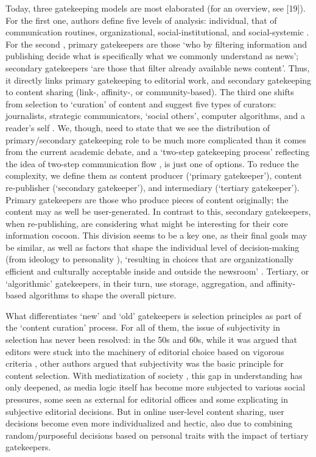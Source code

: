 Today, three gatekeeping models are most elaborated (for an overview, see [19]). For the first one, authors define five levels of analysis: individual, that of communication routines, organizational, social-institutional, and social-systemic \cite{ShoemakerVos}. For the second \cite{Nielsen}, primary gatekeepers are those ‘who by filtering information and publishing decide what is specifically what we commonly understand as news’; secondary gatekeepers ‘are those that filter already available news content’. Thus, it directly links primary gatekeeping to editorial work, and secondary gatekeeping to content sharing (link-, affinity-, or community-based). The third one \cite{ThorsonWells,WellsThroson} shifts from selection to ‘curation’ of content and suggest five types of curators: journalists, strategic communicators, ‘social others’, computer algorithms, and a reader’s self \cite[p.~35]{WellsThroson}
.
We, though, need to state that we see the distribution of primary/secondary gatekeeping role to be much more complicated than it comes from the current academic debate, and a ‘two-step gatekeeping process’ \cite{Singer} reflecting the idea of two-step communication flow \cite{Katz}, is just one of options. To reduce the complexity, we define them as content producer (‘primary gatekeeper’), content re-publisher (‘secondary gatekeeper’), and intermediary (‘tertiary gatekeeper’). Primary gatekeepers are those who produce pieces of content originally; the content may as well be user-generated. In contrast to this, secondary gatekeepers, when re-publishing, are considering what might be interesting for their core information cocoon. This division seems to be a key one, as their final goals may be similar, as well as factors that shape the individual level of decision-making (from ideology to personality \cite{ShoemakerReese}), ‘resulting in choices that are organizationally efficient and culturally acceptable inside and outside the newsroom’ \cite[p.~56]{Singer}. Tertiary, or ‘algorithmic’ \cite{Napoli} gatekeepers, in their turn, use storage, aggregation, and affinity-based algorithms to shape the overall picture.

What differentiates ‘new’ and ‘old’ gatekeepers is selection principles as part of the ‘content curation’ process. For all of them, the issue of subjectivity in selection has never been resolved: in the 50s and 60s, while it was argued that editors were stuck into the machinery of editorial choice based on vigorous criteria \cite{Gieber}, other authors \cite{Snider,White1950} argued that subjectivity was the basic principle for content selection. With mediatization of society \cite{EsserStromback,Hjarvard}, this gap in understanding has only deepened, as media logic itself has become more subjected to various social pressures, some seen as external for editorial offices and some explicating in subjective editorial decisions. But in online user-level content sharing, user decisions become even more individualized and hectic, also due to combining random/purposeful decisions based on personal traits \cite{Bessi} with the impact of tertiary gatekeepers.

